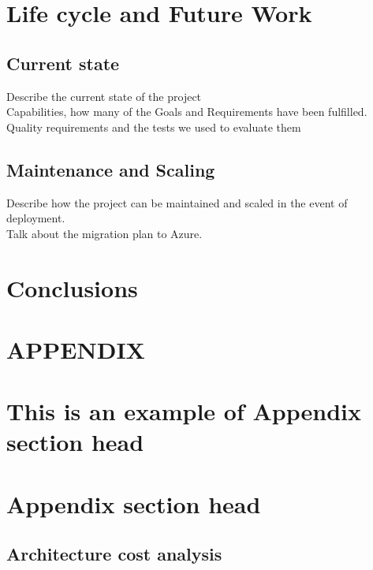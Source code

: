 \documentclass[prodmode,acmtosem]{acmsmall} %
\begin{document}
\section{Life cycle and Future Work}
\subsection{Current state}
Describe the current state of the project\\
Capabilities, how many of the Goals and Requirements have been fulfilled.\\
Quality requirements and the tests we used to evaluate them\\

\subsection{Maintenance and Scaling}
Describe how the project can be maintained and scaled in the event of deployment.\\
Talk about the migration plan to Azure.\\


\section{Conclusions}


\appendix
\section*{APPENDIX} \label{Appendix}
\setcounter{section}{1}


\begin{acks}
\end{acks}  





\elecappendix

\medskip

\section{This is an example of Appendix section head}


\section{Appendix section head}

\subsection{Architecture cost analysis}
\label{ArchitectureCost}
\end{document}

